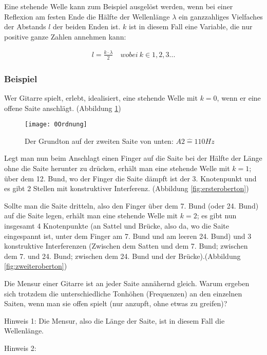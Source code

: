 Eine stehende Welle kann zum Beispiel ausgelöst werden, wenn bei einer Reflexion am festen Ende die Hälfte der Wellenlänge $\lambda$ ein ganzzahliges Vielfaches der Abstands $l$ der beiden Enden ist. $k$ ist in diesem Fall eine Variable, die nur positive ganze Zahlen annehmen kann:
	
	\begin{align} \label{eq:stehendewelle}
		l = \frac{k \cdot \lambda}{2} \quad wobei \ k \in 1,2,3...
	\end{align}
	
	
\subsubsection{Beispiel}

Wer Gitarre spielt, erlebt, idealisiert, eine stehende Welle mit $k=0$, wenn er eine offene Saite anschlägt. (Abbildung \ref{fig:grundton})

\begin{figure}[!h]
		\centering
		\texttt{[image: 0Ordnung]}
		\caption{Der Grundton auf der zweiten Saite von unten: $A2 \widehat{=} 110Hz$}
		\label{fig:grundton}
\end{figure}

Legt man nun beim Anschlagt einen Finger auf die Saite bei der Hälfte der Länge ohne die Saite herunter zu drücken, erhält man eine stehende Welle mit $k=1$; über dem 12. Bund, wo der Finger die Saite dämpft ist der 3. Knotenpunkt und es gibt 2 Stellen mit konstruktiver Interferenz. (Abbildung \ref{fig:ersteroberton})


Sollte man die Saite \glqq dritteln\grqq , also den Finger über dem 7. Bund (oder 24. Bund) auf die Saite legen, erhält man eine stehende Welle mit $k=2$; es gibt nun insgesamt 4 Knotenpunkte (an Sattel und Brücke, also da, wo die Saite eingespannt ist, unter dem Finger am 7. Bund und am leeren 24. Bund) und 3 konstruktive Interferenzen (Zwischen dem Satten und dem 7. Bund; zwischen dem 7. und 24. Bund; zwischen dem 24. Bund und der Brücke).(Abbildung \ref{fig:zweiteroberton})

\begin{Aufgabe}
Die Mensur einer Gitarre ist an jeder Saite annähernd gleich. Warum ergeben sich trotzdem die unterschiedliche Tonhöhen (Frequenzen) an den einzelnen Saiten, wenn man sie offen spielt (nur anzupft, ohne etwas zu greifen)?

Hinweis 1: Die Mensur, also die Länge der Saite, ist in diesem Fall die Wellenlänge.

Hinweis 2: 
\end{Aufgabe}

